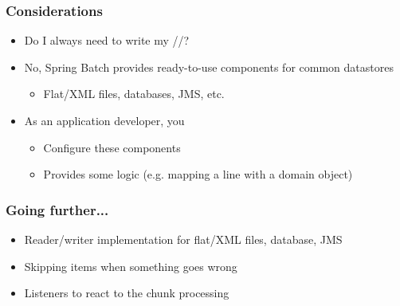 \begin{frame}
 \frametitle{Considerations}
 \begin{itemize}
  \item Do I always need to write my //?
  \item No, Spring Batch provides ready-to-use components for common datastores
  \begin{itemize}
    \item Flat/XML files, databases, JMS, etc.
  \end{itemize}
  \item As an application developer, you
  \begin{itemize}
    \item Configure these components
    \item Provides some logic (e.g. mapping a line with a domain object)
  \end{itemize}
 \end{itemize}
\end{frame}

\begin{frame}
 \frametitle{Going further...}
 \begin{itemize}
  \item Reader/writer implementation for flat/XML files, database, JMS
  \item Skipping items when something goes wrong
  \item Listeners to react to the chunk processing  
 \end{itemize}
\end{frame}

